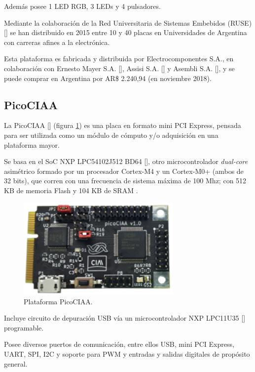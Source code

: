 Además posee 1 LED RGB, 3 LEDs y 4 pulsadores.

Mediante la colaboración de la Red Universitaria de Sistemas Embebidos (RUSE) [] se han distribuido en 2015 entre 10 y 40 placas en Universidades de Argentina con carreras afines a la electrónica.

Esta plataforma es fabricada y distribuida por Electrocomponentes S.A., en colaboración con Ernesto Mayer S.A. [], Assisi S.A. [] y Asembli S.A. [], y se puede comprar en Argentina por AR\$ 2.240,94 (en noviembre 2018). 

\subsection{PicoCIAA}

La PicoCIAA [] (figura \ref{fig:picoCiaa}) es una placa en formato mini PCI Express, pensada para ser utilizada como un módulo de cómputo y/o adquisición en una plataforma mayor.

Se basa en el SoC NXP LPC54102J512 BD64 [], otro microcontrolador \emph{dual-core} asimétrico formado por un procesador Cortex-M4 y un Cortex-M0+ (ambos de 32 bits), que corren con una frecuencia de sistema máxima de 100 Mhz; con 512 KB de memoria Flash y 104 KB de SRAM .

\begin{figure}[!htbp]
\begin{center}  %
\includegraphics*[width=8cm]{Figures/PicoCIAA_Foto.png}
\par\caption{Plataforma PicoCIAA.}\label{fig:picoCiaa}
\end{center}
\end{figure}

Incluye circuito de depuración USB vía un microcontrolador NXP LPC11U35 [] programable.

Posee diversos puertos de comunicación, entre ellos USB, mini PCI Express, UART, SPI, I2C y soporte para PWM y entradas y salidas digitales de propósito general. 

